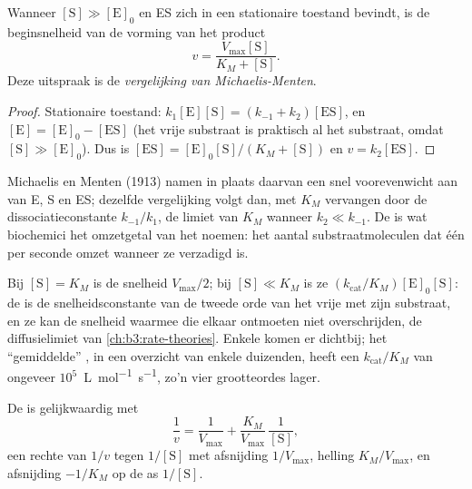 \begin{theorem}\label{thm:b3:complex-kinetics:michaelis-menten}
Wanneer $[\mathrm S] \gg [\mathrm E]_0$ en ES zich in een stationaire
toestand bevindt, is de beginsnelheid van de vorming van het product
\[
  v = \frac{V_{\max}[\mathrm S]}{K_M + [\mathrm S]} .
\]
Deze uitspraak is de \emph{vergelijking van
Michaelis-Menten}.
\end{theorem}

\begin{proof}
Stationaire toestand: $k_1[\mathrm E][\mathrm S] = (k_{-1} + k_2)[\mathrm{ES}]$, en $[\mathrm E] = [\mathrm E]_0 - [\mathrm{ES}]$ (het vrije
substraat is praktisch al het substraat, omdat $[\mathrm S] \gg [\mathrm E]_0$). Dus is $[\mathrm{ES}]
= [\mathrm E]_0[\mathrm S]/(K_M + [\mathrm S])$ en $v = k_2[\mathrm{ES}]$.
\end{proof}

\begin{remark}
Michaelis en Menten (1913) namen in plaats daarvan een snel voorevenwicht
aan van E, S en ES; dezelfde vergelijking volgt dan, met $K_M$ vervangen
door de dissociatieconstante $k_{-1}/k_1$, de limiet van $K_M$ wanneer $k_2 \ll k_{-1}$. De
 is wat biochemici het omzetgetal van het 
noemen: het aantal substraatmoleculen dat één  per seconde
omzet wanneer ze verzadigd is.
\end{remark}

Bij $[\mathrm S] = K_M$ is de snelheid $V_{\max}/2$; bij $[\mathrm S] \ll K_M$ is ze $(k_{\mathrm{cat}}/K_M)[\mathrm E]_0[\mathrm S]$: de
 is de snelheidsconstante van de tweede orde van
het vrije  met zijn substraat, en ze kan de snelheid waarmee die
elkaar ontmoeten niet overschrijden, de diffusielimiet van
\cref{ch:b3:rate-theories}. Enkele  komen er dichtbij; het
``gemiddelde'' , in een overzicht van enkele duizenden, heeft een $k_{\mathrm{cat}}/K_M$ van ongeveer
$10^5$~\unit{L.mol^{-1}.s^{-1}}, zo'n vier grootteordes lager.

\begin{proposition}\label{prop:b3:complex-kinetics:lineweaver}
De  is gelijkwaardig met
\[
  \frac1v = \frac{1}{V_{\max}} + \frac{K_M}{V_{\max}}\,\frac{1}{[\mathrm S]},
\]
een rechte van $1/v$ tegen $1/[\mathrm S]$ met afsnijding $1/V_{\max}$,
helling $K_M/V_{\max}$, en
afsnijding $-1/K_M$ op de as $1/[\mathrm S]$.
\end{proposition}

